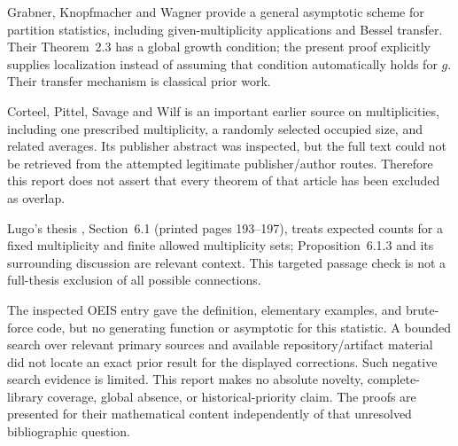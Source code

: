 \documentclass[11pt,letterpaper]{article}
\numberwithin{equation}{section}
\theoremstyle{definition}\newtheorem{definition}[theorem]{Definition}
\theoremstyle{remark}\newtheorem{remark}[theorem]{Remark}
\begin{document}
Grabner, Knopfmacher and Wagner \cite{gkw} provide a general asymptotic scheme for partition statistics, including given-multiplicity applications and Bessel transfer. Their Theorem~2.3 has a global growth condition; the present proof explicitly supplies localization instead of assuming that condition automatically holds for $g$. Their transfer mechanism is classical prior work.

Corteel, Pittel, Savage and Wilf \cite{cpsw} is an important earlier source on multiplicities, including one prescribed multiplicity, a randomly selected occupied size, and related averages. Its publisher abstract was inspected, but the full text could not be retrieved from the attempted legitimate publisher/author routes. Therefore this report does not assert that every theorem of that article has been excluded as overlap.

Lugo's thesis \cite{lugo}, Section~6.1 (printed pages 193--197), treats expected counts for a fixed multiplicity and finite allowed multiplicity sets; Proposition~6.1.3 and its surrounding discussion are relevant context. This targeted passage check is not a full-thesis exclusion of all possible connections.

The inspected OEIS entry gave the definition, elementary examples, and brute-force code, but no generating function or asymptotic for this statistic. A bounded search over relevant primary sources and available repository/artifact material did not locate an exact prior result for the displayed corrections. Such negative search evidence is limited. This report makes no absolute novelty, complete-library coverage, global absence, or historical-priority claim. The proofs are presented for their mathematical content independently of that unresolved bibliographic question.
\end{document}
